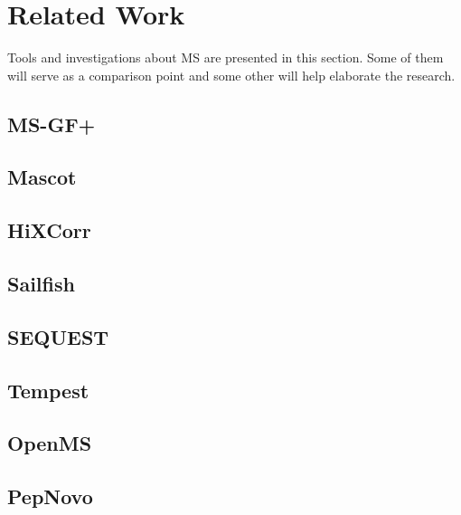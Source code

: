 \newpage
\section{Related Work}
\label{section:related-work}

Tools and investigations about \ac{MS} are presented in this section. Some of them will serve as a comparison point and some other will help elaborate the research.

\subsection{MS-GF+}
%

\subsection{Mascot}
%

\subsection{HiXCorr}
%

\subsection{Sailfish}
%

\subsection{SEQUEST}
%

\subsection{Tempest}
% 

\subsection{OpenMS}
%

\subsection{PepNovo}
%

